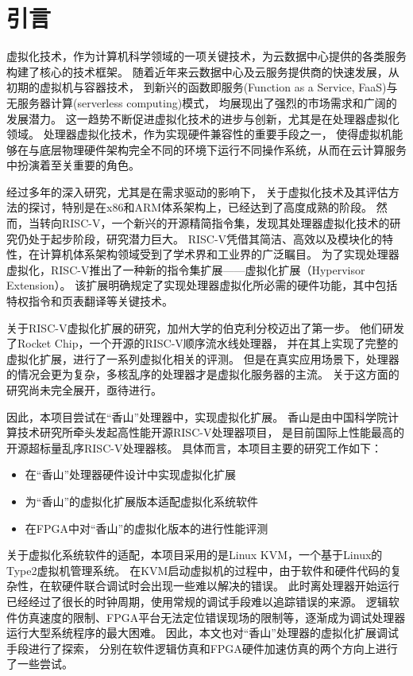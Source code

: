 \chapter{引言}
虚拟化技术，作为计算机科学领域的一项关键技术，为云数据中心提供的各类服务构建了核心的技术框架。
随着近年来云数据中心及云服务提供商的快速发展，从初期的虚拟机与容器技术，
到新兴的函数即服务(Function as a Service, FaaS)与无服务器计算(serverless computing)模式，
均展现出了强烈的市场需求和广阔的发展潜力。
这一趋势不断促进虚拟化技术的进步与创新，尤其是在处理器虚拟化领域。
处理器虚拟化技术，作为实现硬件兼容性的重要手段之一，
使得虚拟机能够在与底层物理硬件架构完全不同的环境下运行不同操作系统，从而在云计算服务中扮演着至关重要的角色。

经过多年的深入研究，尤其是在需求驱动的影响下，
关于虚拟化技术及其评估方法的探讨，特别是在x86和ARM体系架构上，已经达到了高度成熟的阶段。
然而，当转向RISC-V，一个新兴的开源精简指令集，发现其处理器虚拟化技术的研究仍处于起步阶段，研究潜力巨大。
RISC-V凭借其简洁、高效以及模块化的特性，在计算机体系架构领域受到了学术界和工业界的广泛瞩目。
为了实现处理器虚拟化，RISC-V推出了一种新的指令集扩展——虚拟化扩展（Hypervisor Extension）。
该扩展明确规定了实现处理器虚拟化所必需的硬件功能，其中包括特权指令和页表翻译等关键技术。

关于RISC-V虚拟化扩展的研究，加州大学的伯克利分校迈出了第一步。
他们研发了Rocket Chip，一个开源的RISC-V顺序流水线处理器，
并在其上实现了完整的虚拟化扩展，进行了一系列虚拟化相关的评测。
但是在真实应用场景下，处理器的情况会更为复杂，多核乱序的处理器才是虚拟化服务器的主流。
关于这方面的研究尚未完全展开，亟待进行。

因此，本项目尝试在“香山”处理器中，实现虚拟化扩展。
香山是由中国科学院计算技术研究所牵头发起高性能开源RISC-V处理器项目，
是目前国际上性能最高的开源超标量乱序RISC-V处理器核。
具体而言，本项目主要的研究工作如下：

\begin{itemize}
\item 在“香山”处理器硬件设计中实现虚拟化扩展
\item 为“香山”的虚拟化扩展版本适配虚拟化系统软件
\item 在FPGA中对“香山”的虚拟化版本的进行性能评测
\end{itemize}

关于虚拟化系统软件的适配，本项目采用的是Linux KVM，一个基于Linux的Type2虚拟机管理系统。
在KVM启动虚拟机的过程中，由于软件和硬件代码的复杂性，在软硬件联合调试时会出现一些难以解决的错误。
此时离处理器开始运行已经经过了很长的时钟周期，使用常规的调试手段难以追踪错误的来源。
逻辑软件仿真速度的限制、FPGA平台无法定位错误现场的限制等，逐渐成为调试处理器运行大型系统程序的最大困难。
因此，本文也对“香山”处理器的虚拟化扩展调试手段进行了探索，
分别在软件逻辑仿真和FPGA硬件加速仿真的两个方向上进行了一些尝试。